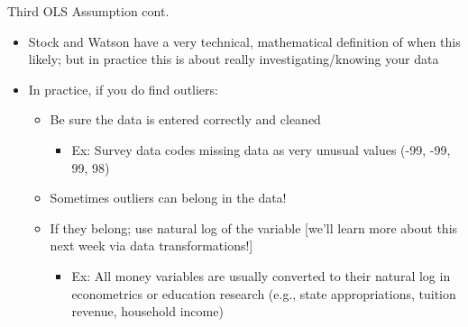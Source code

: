 \documentclass[
  8pt,
  ignorenonframetext,
  dvipsnames]{beamer}
\providecommand{\tightlist}{%
  \setlength{\itemsep}{0pt}\setlength{\parskip}{0pt}}
\let\olditem\item
\renewcommand{\item}{%
  \olditem\vspace{4pt}
}
\begin{document}
\begin{frame}{Third OLS Assumption cont.}
\protect\hypertarget{third-ols-assumption-cont.}{}

\begin{itemize}
\tightlist
\item
  Stock and Watson have a very technical, mathematical definition of
  when this likely; but in practice this is about really
  investigating/knowing your data
\item
  In practice, if you do find outliers:

  \begin{itemize}
  \tightlist
  \item
    Be sure the data is entered correctly and cleaned

    \begin{itemize}
    \tightlist
    \item
      Ex: Survey data codes missing data as very unusual values (-99,
      -99, 99, 98)
    \end{itemize}
  \item
    Sometimes outliers can belong in the data!
  \item
    If they belong; use natural log of the variable {[}we'll learn more
    about this next week via data transformations!{]}

    \begin{itemize}
    \tightlist
    \item
      Ex: All money variables are usually converted to their natural log
      in econometrics or education research (e.g., state appropriations,
      tuition revenue, household income)
    \end{itemize}
  \end{itemize}
\end{itemize}

\end{frame}
\end{document}

